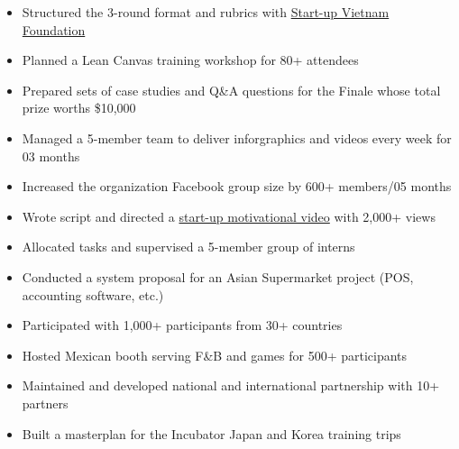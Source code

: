 \documentclass[10pt,a4paper,ragged2e]{altacv}
\begin{document}
\vskip 0.2in


\begin{itemize}
	\item Structured the 3-round format and rubrics with {\href{https://svf.org.vn/}{Start-up Vietnam Foundation}} 
	\item Planned a Lean Canvas training workshop for 80+ attendees
	\item Prepared sets of case studies and Q\&A questions for the Finale whose total prize worths \$10,000
\end{itemize}

\divider

\begin{itemize}
	\item Managed a 5-member team to deliver inforgraphics and videos every week for 03 months 
	\item Increased the organization Facebook group size by 600+ members/05 months
	\item Wrote script and directed a {\href{https://www.facebook.com/uavsnsw/videos/433640800560301/}{start-up motivational video}} with 2,000+ views
\end{itemize}

\divider

\begin{itemize}
	\item Allocated tasks and supervised a 5-member group of interns
	\item Conducted a system proposal for an Asian Supermarket project (POS, accounting software, etc.)
\end{itemize}

\begin{itemize}
	\item Participated with 1,000+ participants from 30+ countries
	\item Hosted Mexican booth serving F\&B and games for 500+ participants
\end{itemize}

\divider

\begin{itemize}
	\item Maintained and developed national and international partnership with 10+ partners
	\item Built a masterplan for the Incubator Japan and Korea training trips 
\end{itemize}
\end{document}
